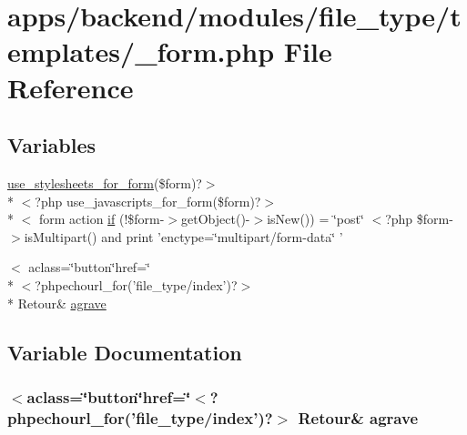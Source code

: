 \hypertarget{backend_2modules_2file__type_2templates_2__form_8php}{\section{apps/backend/modules/file\-\_\-type/templates/\-\_\-form.php File Reference}
\label{backend_2modules_2file__type_2templates_2__form_8php}
}
\subsection*{Variables}
\begin{DoxyCompactItemize}
\item 
\hyperlink{live_2modules_2user_2templates_2__form_8php_a86bc4522fdbe625b07bc4a4d6eec3df7}{use\-\_\-stylesheets\-\_\-for\-\_\-form}(\$form)?$>$\\*
$<$?php use\-\_\-javascripts\-\_\-for\-\_\-form(\$form)?$>$\\*
$<$ form action \hyperlink{backend_2modules_2file__type_2templates_2__form_8php_abd1acf0179bbb4a56e04d4fccdbc121f}{if} (!\$form-\/$>$get\-Object()-\/$>$is\-New()) = \char`\"{}post\char`\"{} $<$?php \$form-\/$>$is\-Multipart() and print 'enctype=\char`\"{}multipart/form-\/data\char`\"{} '
\item 
$<$ aclass=\char`\"{}button\char`\"{}href=\char`\"{}\\*
$<$?phpechourl\-\_\-for('file\-\_\-type/index')?$>$\\*
 Retour\& \hyperlink{backend_2modules_2file__type_2templates_2__form_8php_ae18ac8e6d9a51023fb286731d9c82779}{agrave}
\end{DoxyCompactItemize}


\subsection{Variable Documentation}
\hypertarget{backend_2modules_2file__type_2templates_2__form_8php_ae18ac8e6d9a51023fb286731d9c82779}{
\subsubsection[{agrave}]{\setlength{\rightskip}{0pt plus 5cm}$<$aclass=\char`\"{}button\char`\"{}href=\char`\"{}$<$?phpechourl\-\_\-for('file\-\_\-type/index')?$>$ Retour\& agrave}}\label{backend_2modules_2file__type_2templates_2__form_8php_ae18ac8e6d9a51023fb286731d9c82779}


